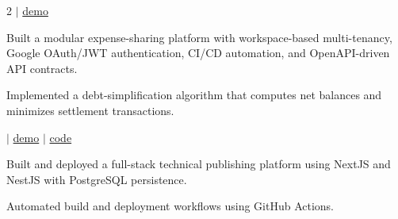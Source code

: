 \documentclass[]{hieudo-build}
\begin{document}
\begin{paracol}{2}
 $|$ \href{https://www.vikramaditya-singh.in}{demo}

\begin{tightemize}
\item Built a modular expense-sharing platform with workspace-based multi-tenancy, Google OAuth/JWT authentication, CI/CD automation, and OpenAPI-driven API contracts.
\item Implemented a debt-simplification algorithm that computes net balances and minimizes settlement transactions.
\end{tightemize}
\sectionsep 

 $|$ \href{https://www.neuralcook.com}{demo} $|$ \href{https://github.com/Vikramadtya/Blog}{code}

\begin{tightemize}
\item Built and deployed a full-stack technical publishing platform using NextJS and NestJS with PostgreSQL persistence.
\item Automated build and deployment workflows using GitHub Actions.
\end{tightemize}
\sectionsep 

\end{paracol}
\end{document}
